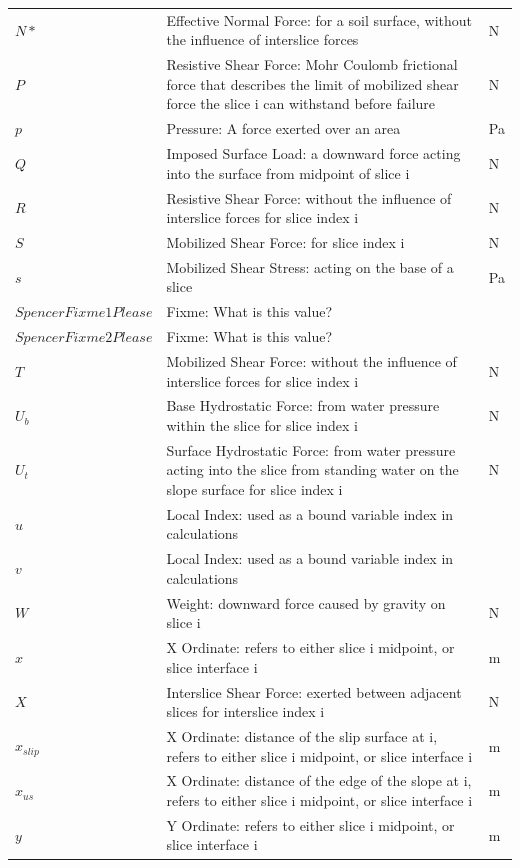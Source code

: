 \documentclass[12pt]{article}
\begin{document}
\begin{longtabu}{l X[l] l}
\\
$N*$ & Effective Normal Force: for a soil surface, without the influence of interslice forces & N
\\
$P$ & Resistive Shear Force: Mohr Coulomb frictional force that describes the limit of mobilized shear force the slice i can withstand before failure & N
\\
$p$ & Pressure: A force exerted over an area & Pa
\\
$Q$ & Imposed Surface Load: a downward force acting into the surface from midpoint of slice i & N
\\
$R$ & Resistive Shear Force: without the influence of interslice forces for slice index i & N
\\
$S$ & Mobilized Shear Force: for slice index i & N
\\
$s$ & Mobilized Shear Stress: acting on the base of a slice & Pa
\\
$SpencerFixme1Please$ & Fixme: What is this value? & 
\\
$SpencerFixme2Please$ & Fixme: What is this value? & 
\\
$T$ & Mobilized Shear Force: without the influence of interslice forces for slice index i & N
\\
${U_{b}}$ & Base Hydrostatic Force: from water pressure within the slice for slice index i & N
\\
${U_{t}}$ & Surface Hydrostatic Force: from water pressure acting into the slice from standing water on the slope surface for slice index i & N
\\
$u$ & Local Index: used as a bound variable index in calculations & 
\\
$v$ & Local Index: used as a bound variable index in calculations & 
\\
$W$ & Weight: downward force caused by gravity on slice i & N
\\
$x$ & X Ordinate: refers to either slice i midpoint, or slice interface i & m
\\
$X$ & Interslice Shear Force: exerted between adjacent slices for interslice index i & N
\\
${x_{slip}}$ & X Ordinate: distance of the slip surface at i, refers to either slice i midpoint, or slice interface i & m
\\
${x_{us}}$ & X Ordinate: distance of the edge of the slope at i, refers to either slice i midpoint, or slice interface i & m
\\
$y$ & Y Ordinate: refers to either slice i midpoint, or slice interface i & m

\end{longtabu}
\end{document}
